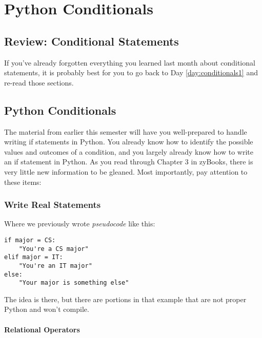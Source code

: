 
\chapter{Python Conditionals}


\minitoc

\section{Review: Conditional Statements}

If you've already forgotten everything you learned last month about conditional statements, it is probably best for you to go back to Day \ref{day:conditionals1} and re-read those sections.

\section{Python Conditionals}
\label{sec:pythonconditionals}

The material from earlier this semester will have you well-prepared to handle writing if statements in Python.  You already know how to identify the possible values and outcomes of a condition, and you largely already know how to write an if statement in Python.  As you read through Chapter 3 in zyBooks, there is very little new information to be gleaned.  Most importantly, pay attention to these items:

\subsection{Write Real Statements}
Where we previously wrote \textit{pseudocode} like this:

\begin{verbatim}
if major = CS:
    "You're a CS major"
elif major = IT:
    "You're an IT major"
else:
    "Your major is something else"
\end{verbatim}

The idea is there, but there are portions in that example that are not proper Python and won't compile.

\subsubsection{Relational Operators}

